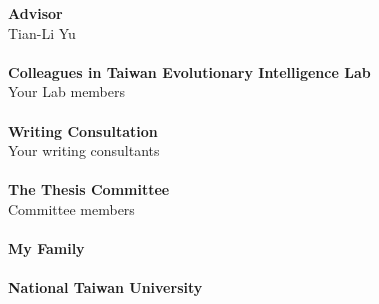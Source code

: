 \begin{acknowledgementsEN}

\noindent
\textbf{Advisor}\\
Tian-Li Yu\\
\\
\textbf{Colleagues in Taiwan Evolutionary Intelligence Lab} \\
Your Lab members\\
\\
\textbf{Writing Consultation} \\
Your writing consultants\\
\\
\textbf{The Thesis Committee} \\
Committee members\\
\\
\textbf{My Family} \\
\\
\textbf{National Taiwan University} \\
\\

\end{acknowledgementsEN}
